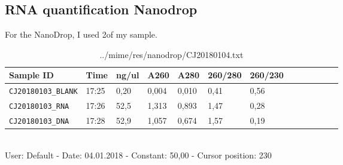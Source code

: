 \subsection{RNA quantification Nanodrop}
\label{task:20180104_cj2}

For the NanoDrop, I used 2\uL of my sample.

\begin{table}[H]
\caption{../mime/res/nanodrop/CJ20180104.txt}
\label{tab:CJ20180104}
\centering
\begin{tabular}{l l l l l l l l l l l l l }
\toprule
Sample ID & Time  & ng/ul  & A260  & A280  & 260/280  & 260/230  \\ \midrule
\texttt{CJ20180103\_BLANK} & 17:25 & 0,20 & 0,004 & 0,010 & 0,41 & 0,56 \\
\texttt{CJ20180103\_RNA} & 17:26 & 52,5 & 1,313 & 0,893 & 1,47 & 0,28 \\
\texttt{CJ20180103\_DNA} & 17:28 & 52,9 & 1,057 & 0,674 & 1,57 & 0,19 \\

\bottomrule
\end{tabular}
\\
User: Default - Date: 04.01.2018 - Constant: 50,00 - Cursor position: 230 \
\end{table}

